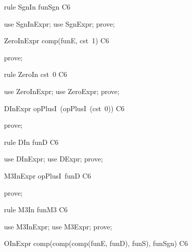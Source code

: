 \documentclass{article}
\begin{document}
\begin{theorem}{rule SgnIn}
  funSgn \in C6
\end{theorem}

\begin{zproof}
use SgnInExpr;
use SgnExpr;
prove;
\end{zproof}

\begin{theorem}{ZeroInExpr}
  comp(funE, cst~1) \in C6
\end{theorem}

\begin{zproof}
prove;
\end{zproof}

\begin{theorem}{rule ZeroIn}
  cst~0 \in C6
\end{theorem}

\begin{zproof}
use ZeroInExpr;
use ZeroExpr;
prove;
\end{zproof}

\begin{theorem}{DInExpr}
  opPlusI~(opPlusI~(cst~0)) \in C6
\end{theorem}

\begin{zproof}
prove;
\end{zproof}

\begin{theorem}{rule DIn}
  funD \in C6
\end{theorem}

\begin{zproof}
use DInExpr;
use DExpr;
prove;
\end{zproof}

\begin{theorem}{M3InExpr}
  opPlusI~funD \in C6
\end{theorem}

\begin{zproof}
prove;
\end{zproof}

\begin{theorem}{rule M3In}
  funM3 \in C6
\end{theorem}

\begin{zproof}
use M3InExpr;
use M3Expr;
prove;
\end{zproof}

\begin{theorem}{OInExpr}
  comp(comp(comp(funE, funD), funS), funSgn) \in C6
\end{theorem}
\end{document}
